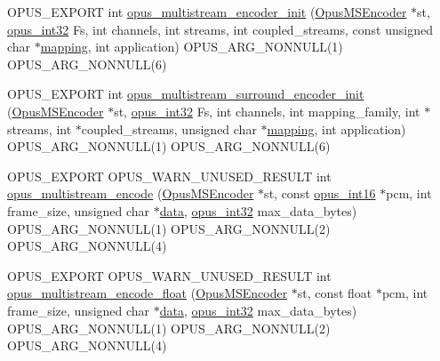 \begin{DoxyCompactItemize}
\item 
O\+P\+U\+S\+\_\+\+E\+X\+P\+O\+RT int \mbox{\hyperlink{group__opus__multistream_gaf9045180b3a93d7cc3d1197859b767a8}{opus\+\_\+multistream\+\_\+encoder\+\_\+init}} (\mbox{\hyperlink{group__opus__multistream_gae5826674d142fc873ebc1d781c507dd7}{Opus\+M\+S\+Encoder}} $\ast$st, \mbox{\hyperlink{opus__types_8h_aa4d309d6f80b99dbabebc8f98879ab9a}{opus\+\_\+int32}} Fs, int channels, int streams, int coupled\+\_\+streams, const unsigned char $\ast$\mbox{\hyperlink{_s_d_l__opengl__glext_8h_aa4f194e5160ccbb5a8e83ab6ef4676d2}{mapping}}, int application) O\+P\+U\+S\+\_\+\+A\+R\+G\+\_\+\+N\+O\+N\+N\+U\+LL(1) O\+P\+U\+S\+\_\+\+A\+R\+G\+\_\+\+N\+O\+N\+N\+U\+LL(6)
\item 
O\+P\+U\+S\+\_\+\+E\+X\+P\+O\+RT int \mbox{\hyperlink{group__opus__multistream_ga786d90cfe8f8b8f371b0137ac76b1559}{opus\+\_\+multistream\+\_\+surround\+\_\+encoder\+\_\+init}} (\mbox{\hyperlink{group__opus__multistream_gae5826674d142fc873ebc1d781c507dd7}{Opus\+M\+S\+Encoder}} $\ast$st, \mbox{\hyperlink{opus__types_8h_aa4d309d6f80b99dbabebc8f98879ab9a}{opus\+\_\+int32}} Fs, int channels, int mapping\+\_\+family, int $\ast$streams, int $\ast$coupled\+\_\+streams, unsigned char $\ast$\mbox{\hyperlink{_s_d_l__opengl__glext_8h_aa4f194e5160ccbb5a8e83ab6ef4676d2}{mapping}}, int application) O\+P\+U\+S\+\_\+\+A\+R\+G\+\_\+\+N\+O\+N\+N\+U\+LL(1) O\+P\+U\+S\+\_\+\+A\+R\+G\+\_\+\+N\+O\+N\+N\+U\+LL(6)
\item 
O\+P\+U\+S\+\_\+\+E\+X\+P\+O\+RT O\+P\+U\+S\+\_\+\+W\+A\+R\+N\+\_\+\+U\+N\+U\+S\+E\+D\+\_\+\+R\+E\+S\+U\+LT int \mbox{\hyperlink{group__opus__multistream_ga5276a2212541e65624f52e906d3dff42}{opus\+\_\+multistream\+\_\+encode}} (\mbox{\hyperlink{group__opus__multistream_gae5826674d142fc873ebc1d781c507dd7}{Opus\+M\+S\+Encoder}} $\ast$st, const \mbox{\hyperlink{opus__types_8h_acc9ed7cf60479eb81f9648c6ec27dc26}{opus\+\_\+int16}} $\ast$pcm, int frame\+\_\+size, unsigned char $\ast$\mbox{\hyperlink{_s_d_l__opengl_8h_a2e335d56e2846b0fea47eed068b2d34a}{data}}, \mbox{\hyperlink{opus__types_8h_aa4d309d6f80b99dbabebc8f98879ab9a}{opus\+\_\+int32}} max\+\_\+data\+\_\+bytes) O\+P\+U\+S\+\_\+\+A\+R\+G\+\_\+\+N\+O\+N\+N\+U\+LL(1) O\+P\+U\+S\+\_\+\+A\+R\+G\+\_\+\+N\+O\+N\+N\+U\+LL(2) O\+P\+U\+S\+\_\+\+A\+R\+G\+\_\+\+N\+O\+N\+N\+U\+LL(4)
\item 
O\+P\+U\+S\+\_\+\+E\+X\+P\+O\+RT O\+P\+U\+S\+\_\+\+W\+A\+R\+N\+\_\+\+U\+N\+U\+S\+E\+D\+\_\+\+R\+E\+S\+U\+LT int \mbox{\hyperlink{group__opus__multistream_gabc78b732d2e7b6ceb27c63888255ef56}{opus\+\_\+multistream\+\_\+encode\+\_\+float}} (\mbox{\hyperlink{group__opus__multistream_gae5826674d142fc873ebc1d781c507dd7}{Opus\+M\+S\+Encoder}} $\ast$st, const float $\ast$pcm, int frame\+\_\+size, unsigned char $\ast$\mbox{\hyperlink{_s_d_l__opengl_8h_a2e335d56e2846b0fea47eed068b2d34a}{data}}, \mbox{\hyperlink{opus__types_8h_aa4d309d6f80b99dbabebc8f98879ab9a}{opus\+\_\+int32}} max\+\_\+data\+\_\+bytes) O\+P\+U\+S\+\_\+\+A\+R\+G\+\_\+\+N\+O\+N\+N\+U\+LL(1) O\+P\+U\+S\+\_\+\+A\+R\+G\+\_\+\+N\+O\+N\+N\+U\+LL(2) O\+P\+U\+S\+\_\+\+A\+R\+G\+\_\+\+N\+O\+N\+N\+U\+LL(4)

\end{DoxyCompactItemize}
